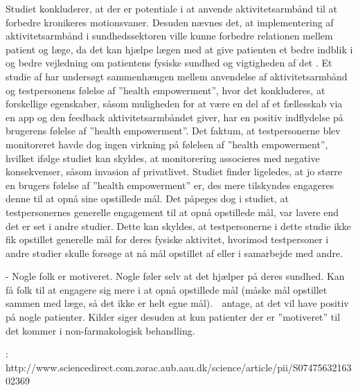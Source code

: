 Studiet konkluderer, at der er potentiale i at anvende aktivitetsarmbånd til at forbedre kronikeres motionsvaner. Desuden nævnes det, at implementering af aktivitetsarmbånd i sundhedssektoren ville kunne forbedre relationen mellem patient og læge, da det kan hjælpe lægen med at give patienten et bedre indblik i og bedre vejledning om patientens fysiske sundhed og vigtigheden af det \citep{mercer2016}. 
Et studie af \citep{nelson2016} har undersøgt sammenhængen mellem anvendelse af aktivitetsarmbånd og testpersonens følelse af ”health empowerment”, hvor det konkluderes, at forskellige egenskaber, såsom muligheden for at være en del af et fællesskab via en app og den feedback aktivitetsarmbåndet giver, har en positiv indflydelse på brugerens følelse af ”health empowerment”. Det faktum, at testpersonerne blev monitoreret havde dog ingen virkning på følelsen af ”health empowerment”, hvilket ifølge studiet kan skyldes, at monitorering associeres med negative konsekvenser, såsom invasion af privatlivet.
Studiet finder ligeledes, at jo større en brugers følelse af ”health empowerment” er, des mere tilskyndes engageres denne til at opnå sine opstillede mål. Det påpeges dog i studiet, at testpersonernes generelle engagement til at opnå opstillede mål, var lavere end det er set i andre studier. Dette kan skyldes, at testpersonerne i dette studie ikke fik opstillet generelle mål for deres fysiske aktivitet, hvorimod testpersoner i andre studier skulle forsøge at nå mål opstillet af eller i samarbejde med andre. 

- Nogle folk er motiveret. Nogle føler selv at det hjælper på deres sundhed. Kan få folk til at engagere sig mere i at opnå opstillede mål (måske mål opstillet sammen med læge, så det ikke er helt egne mål).  antage, at det vil have positiv på nogle patienter. Kilder siger desuden at kun patienter der er ”motiveret” til det kommer i non-farmakologisk behandling. 

\citep{nelson2016}: http://www.sciencedirect.com.zorac.aub.aau.dk/science/article/pii/S0747563216302369 
